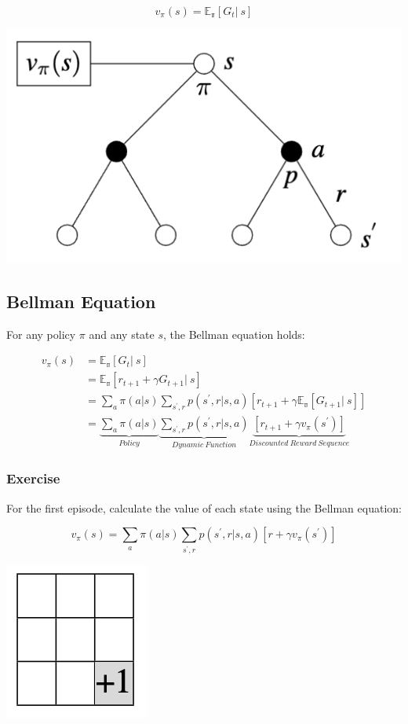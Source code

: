 \documentclass[
  letterpaper,
  DIV=11,
  numbers=noendperiod]{scrreprt}
\begin{document}
\[
v_{\pi}(s) = \mathbb{E_{\pi}}[G_{t}| \ s]
\]

\begin{center}
\includegraphics[width=0.35\linewidth,height=\textheight,keepaspectratio]{lecture4/images/ValueFunction.png}
\end{center}

\subsection{Bellman Equation}\label{bellman-equation}

For any policy \(\pi\) and any state \(s\), the Bellman equation holds:

\[
\begin{aligned}
v_{\pi}(s) &= \mathbb{E_{\pi}}[G_{t}| \ s] \\
&= \mathbb{E_{\pi}}[r_{t+1} + \gamma G_{t+1}| \ s] \\
&= \sum_{a} \pi(a|s) \sum_{s^{'},r} p(s^{'},r|s,a)[r_{t+1} + \gamma \mathbb{E_{\pi}}[G_{t+1}| \ s]] \\
&= \underbrace{\sum_{a} \pi(a|s)}_{Policy} \underbrace{\sum_{s^{'}, r} p(s^{'},r|s,a)}_{Dynamic \ Function}\underbrace{[r_{t+1} + \gamma v_{\pi}(s^{'})]}_{Discounted \ Reward \ Sequence}
\end{aligned}
\]

\subsubsection{Exercise}\label{exercise-9}

For the first episode, calculate the value of each state using the
Bellman equation:

\[
v_{\pi}(s) = \sum_{a} \pi(a|s) \sum_{s^{'}, r} p(s^{'},r|s,a)[r + \gamma v_{\pi}(s^{'})]
\]

\begin{center}
\includegraphics[width=0.13\linewidth,height=\textheight,keepaspectratio]{lecture4/images/GridWorldEmpty-ex.png}
\end{center}
\end{document}
